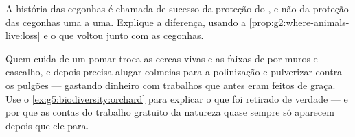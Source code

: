 \begin{exercise}[$\star\star$]\label{exo:g5:biodiversity:10}
A história das cegonhas é chamada de sucesso da proteção do
\emph{}, e não da proteção das cegonhas uma a uma. Explique a
diferença, usando a \cref{prop:g2:where-animals-live:loss} e o que
voltou junto com as cegonhas.
\end{exercise}

\begin{exercise}[$\star\star\star$]\label{exo:g5:biodiversity:11}
Quem cuida de um pomar troca as cercas vivas e as faixas de 
por muros e cascalho, e depois precisa alugar colmeias para a
polinização e pulverizar contra os pulgões --- gastando dinheiro com
trabalhos que antes eram feitos de graça. Use o
\cref{ex:g5:biodiversity:orchard} para explicar o que foi retirado
de verdade --- e por que as contas do trabalho gratuito da natureza
quase sempre só aparecem depois que ele para.
\end{exercise}
